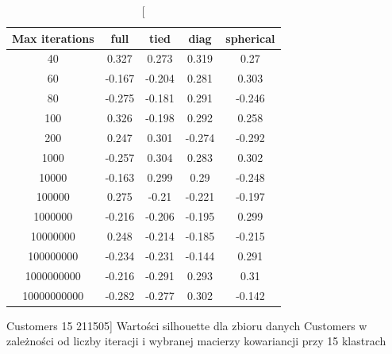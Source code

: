 \documentclass{classrep}
\begin{document}
{{            \begin{table}[!htbp]
                \begin{minipage}{1\textwidth}
                \centering
                \begin{tabular}{|c|c|c|c|c|}
                \hline
                Max iterations & full & tied & diag & spherical \\ \hline
                40 & 0.327 & 0.273 & 0.319 & 0.27 \\ \hline
                60 & -0.167 & -0.204 & 0.281 & 0.303 \\ \hline
                80 & -0.275 & -0.181 & 0.291 & -0.246 \\ \hline
                100 & 0.326 & -0.198 & 0.292 & 0.258 \\ \hline
                200 & 0.247 & 0.301 & -0.274 & -0.292 \\ \hline
                1000 & -0.257 & 0.304 & 0.283 & 0.302 \\ \hline
                10000 & -0.163 & 0.299 & 0.29 & -0.248 \\ \hline
                100000 & 0.275 & -0.21 & -0.221 & -0.197 \\ \hline
                1000000 & -0.216 & -0.206 & -0.195 & 0.299 \\ \hline
                10000000 & 0.248 & -0.214 & -0.185 & -0.215 \\ \hline
                100000000 & -0.234 & -0.231 & -0.144 & 0.291 \\ \hline
                1000000000 & -0.216 & -0.291 & 0.293 & 0.31 \\ \hline
                10000000000 & -0.282 & -0.277 & 0.302 & -0.142 \\ \hline
                \end{tabular}
                \caption
                [Customers 15 211505]
                {Wartości silhouette dla zbioru danych Customers w zależności od
                liczby iteracji i wybranej macierzy kowariancji przy 15 klastrach}
                \label{Customers_15_211505}
                \end{minipage}
                \hfill


\end{table}}}
\end{document}
